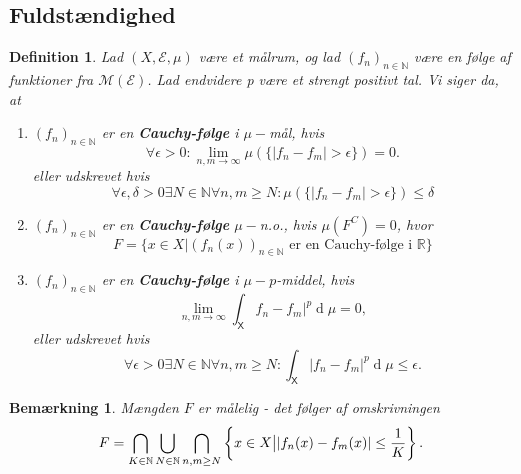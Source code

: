 \documentclass{article}
\newcommand{\N}{\mathbb{N}}
\newcommand{\R}{\mathbb{R}}
\newcommand{\1}{\mathbbm{1}}
\newcommand{\X}{\mathsf{X}}
\newcommand{\deriv}{\operatorname{d}}
\theoremstyle{boxed}
\newtheorem{definition}[theorem]{Definition}
\newtheorem{remark}[theorem]{Bemærkning}
\begin{document}
\subsection{Fuldstændighed}
\begin{theorem-box}
    \begin{definition}
        Lad $(X,\mathcal{E},\mu)$ være et målrum, og lad $(f_n)_{n\in\N}$ være en følge af funktioner fra $\mathcal{M}(\mathcal{E})$. Lad endvidere p være et strengt positivt tal. Vi siger da, at 
        \begin{enumerate}
            \item[\textnormal{(a)}] $(f_n)_{n\in\N}$ er en \textbf{Cauchy-følge} i $\mu-$mål, hvis
            $$\forall\epsilon>0: \lim_{n,m\rightarrow \infty}\mu\left(\{|f_n-f_m|>\epsilon\}\right)=0.$$
            eller udskrevet hvis 
            $$\forall\epsilon,\delta>0\exists N\in\N\forall n,m\geq N: \mu\left(\{|f_n-f_m|>\epsilon\}\right)\leq \delta$$
            \item[\textnormal{(b)}] $(f_n)_{n\in\N}$ er en \textbf{Cauchy-følge} $\mu-$n.o., hvis $\mu(F^C)=0$, hvor
            $$F=\{x\in X|(f_n(x))_{n\in\N}\text{ er en Cauchy-følge i }\R\}$$
            \item[\textnormal{(c)}] $(f_n)_{n\in\N}$ er en \textbf{Cauchy-følge} i $\mu-p$-middel, hvis
            $$\lim_{n,m\rightarrow \infty}\int_\X f_n-f_m|^p\deriv \mu  = 0,$$
            eller udskrevet hvis 
            $$\forall \epsilon>0\exists N\in\N\forall n,m\geq N:\int_\X |f_n-f_m|^p\deriv\mu\leq\epsilon.$$
        \end{enumerate}
    \end{definition}
\end{theorem-box}
\begin{remark}
    Mængden $F$ er målelig - det følger af omskrivningen $$F=\bigcap_{K\in\N}\bigcup_{N\in\N}\bigcap_{n,m\geq N}\left\{x\in X\big{|}|f_n(x)-f_m(x)|\leq \frac{1}{K}\right\}.$$
\end{remark}
\end{document}
